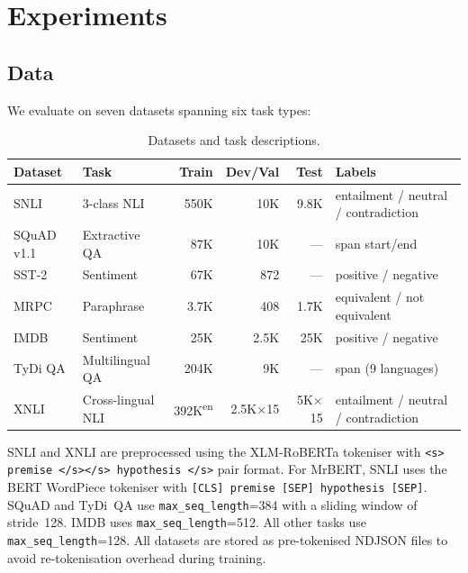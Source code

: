 

\section{Experiments}
\label{sec:experiments}

\subsection{Data}
\label{sec:data}

We evaluate on seven datasets spanning six task types:

\begin{table}[h]
\centering
\small
\begin{tabular}{@{}llrrrL{4.5cm}@{}}
\toprule
\textbf{Dataset} & \textbf{Task} & \textbf{Train} & \textbf{Dev/Val} & \textbf{Test} & \textbf{Labels} \\
\midrule
SNLI     & 3-class NLI          & 550K & 10K  & 9.8K & entailment / neutral / contradiction \\
SQuAD v1.1 & Extractive QA      & 87K  & 10K  & ---  & span start/end \\
SST-2    & Sentiment            & 67K  & 872  & ---  & positive / negative \\
MRPC     & Paraphrase           & 3.7K & 408  & 1.7K & equivalent / not equivalent \\
IMDB     & Sentiment            & 25K  & 2.5K & 25K  & positive / negative \\
TyDi QA  & Multilingual QA      & 204K & 9K   & ---  & span (9 languages) \\
XNLI     & Cross-lingual NLI    & 392K\textsuperscript{en} & 2.5K$\times$15 & 5K$\times$15 & entailment / neutral / contradiction \\
\bottomrule
\end{tabular}
\caption{Datasets and task descriptions.}
\label{tab:datasets}
\end{table}

SNLI and XNLI are preprocessed using the XLM-RoBERTa tokeniser with \texttt{<s> premise </s></s> hypothesis </s>} pair format.
For MrBERT, SNLI uses the BERT WordPiece tokeniser with \texttt{[CLS] premise [SEP] hypothesis [SEP]}.
SQuAD and TyDi~QA use \texttt{max\_seq\_length}=384 with a sliding window of stride~128.
IMDB uses \texttt{max\_seq\_length}=512.
All other tasks use \texttt{max\_seq\_length}=128.
All datasets are stored as pre-tokenised NDJSON files to avoid re-tokenisation overhead during training.


